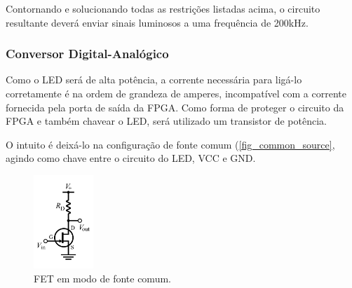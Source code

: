 	Contornando e solucionando todas as restrições listadas acima, o circuito resultante deverá enviar sinais luminosos a uma frequência de 200kHz.

	
	\subsubsection{Conversor Digital-Analógico}
	Como o LED será de alta potência, a corrente necessária para ligá-lo corretamente é na ordem de grandeza de amperes, incompatível com a corrente fornecida pela porta de saída da FPGA. Como forma de proteger o circuito da FPGA e também chavear o LED, será utilizado um transistor de potência.
		
	O intuito é deixá-lo na configuração de fonte comum (\autoref{fig_common_source}, agindo como chave entre o circuito do LED, VCC e GND.
		
	\begin{figure}[htb]
		\caption{\label{fig_common_source} FET em modo de fonte comum.}
		\centering
		\includegraphics[width=0.2\textwidth]{circuits/common_source.pdf}
	\end{figure}

